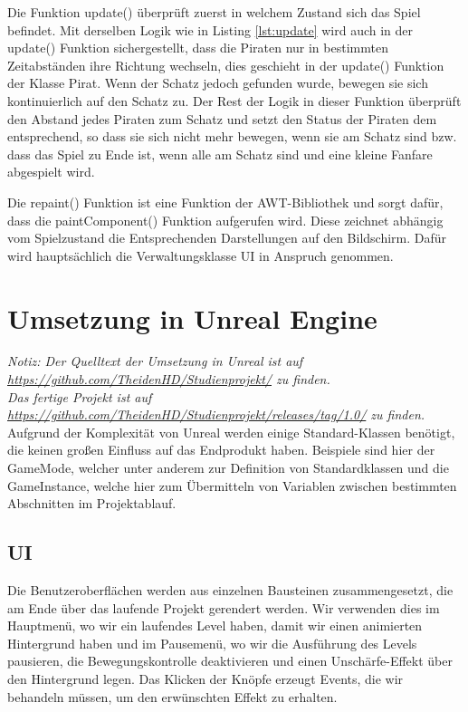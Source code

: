 \documentclass[
	12pt, %
	a4paper,
	listof=totoc, %
	bibliography=totoc, %
	numbers=noenddot, %
	ngerman, %
	headsepline, %
	oneside %
	]{scrbook} %
\begin{document}
Die Funktion update() überprüft zuerst in welchem Zustand sich das Spiel befindet. Mit derselben Logik wie in Listing \ref{lst:update} wird auch in der update() Funktion sichergestellt, dass die Piraten nur in bestimmten Zeitabständen ihre Richtung wechseln, dies geschieht in der update() Funktion der Klasse Pirat.
Wenn der Schatz jedoch gefunden wurde, bewegen sie sich kontinuierlich auf den Schatz zu.
Der Rest der Logik in dieser Funktion überprüft den Abstand jedes Piraten zum Schatz und setzt den Status der Piraten dem entsprechend, so dass sie sich nicht mehr bewegen, wenn sie am Schatz sind bzw. dass das Spiel zu Ende ist, wenn alle am Schatz sind und eine kleine Fanfare abgespielt wird.
  
  
Die repaint() Funktion ist eine Funktion der AWT-Bibliothek und sorgt dafür, dass die paintComponent() Funktion aufgerufen wird. Diese zeichnet abhängig vom Spielzustand die Entsprechenden Darstellungen auf den Bildschirm. Dafür wird hauptsächlich die Verwaltungsklasse UI in Anspruch genommen.



\section{Umsetzung in Unreal Engine}
\emph{Notiz: Der Quelltext der Umsetzung in Unreal ist auf \url{https://github.com/TheidenHD/Studienprojekt/} zu finden. \\
Das fertige Projekt ist auf \url{https://github.com/TheidenHD/Studienprojekt/releases/tag/1.0/} zu finden.}\\

Aufgrund der Komplexität von Unreal werden einige Standard-Klassen benötigt, die keinen großen Einfluss auf das Endprodukt haben. Beispiele sind hier der GameMode, welcher unter anderem zur Definition von Standardklassen und die GameInstance, welche hier zum Übermitteln von Variablen zwischen bestimmten Abschnitten im Projektablauf.

\subsection{UI}
Die Benutzeroberflächen werden aus einzelnen Bausteinen zusammengesetzt, die am Ende über das laufende Projekt gerendert werden. Wir verwenden dies im Hauptmenü, wo wir ein laufendes Level haben, damit wir einen animierten Hintergrund haben und im Pausemenü, wo wir die Ausführung des Levels pausieren, die Bewegungskontrolle deaktivieren und einen Unschärfe-Effekt über den Hintergrund legen. Das Klicken der Knöpfe erzeugt Events, die wir behandeln müssen, um den erwünschten Effekt zu erhalten.
\end{document}
